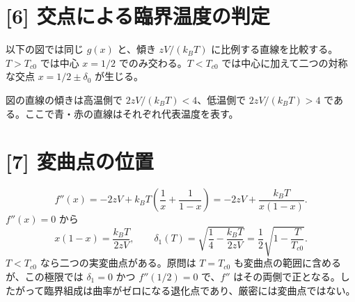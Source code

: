 \documentclass[11pt,a4paper]{article}
\begin{document}
\section*{[6] 交点による臨界温度の判定}
以下の図では同じ $g(x)$ と、傾き $zV/(k_BT)$ に比例する直線を比較する。$T>T_{c0}$ では中心 $x=1/2$ でのみ交わる。$T<T_{c0}$ では中心に加えて二つの対称な交点 $x=1/2\pm\delta_0$ が生じる。
\begin{center}
\end{center}
図の直線の傾きは高温側で $2zV/(k_BT)<4$、低温側で $2zV/(k_BT)>4$ である。ここで青・赤の直線はそれぞれ代表温度を表す。

\section*{[7] 変曲点の位置}
\[
f''(x)=-2zV+k_BT\left(\frac1x+\frac1{1-x}\right)
=-2zV+\frac{k_BT}{x(1-x)}.
\]
$f''(x)=0$ から
\[
x(1-x)=\frac{k_BT}{2zV},\qquad
\boxed{\delta_1(T)=\sqrt{\frac14-\frac{k_BT}{2zV}}
=\frac12\sqrt{1-\frac{T}{T_{c0}}}}.
\]
$T<T_{c0}$ なら二つの実変曲点がある。原問は $T=T_{c0}$ も変曲点の範囲に含めるが、この極限では $\delta_1=0$ かつ $f''(1/2)=0$ で、$f''$ はその両側で正となる。したがって臨界組成は曲率がゼロになる退化点であり、厳密には変曲点ではない。
\end{document}
